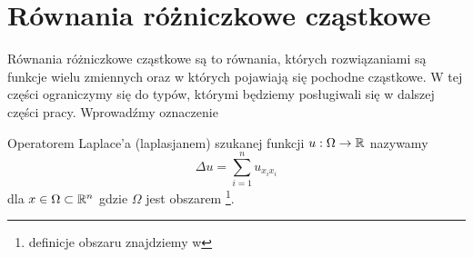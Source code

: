 \documentclass[12pt,a4paper]{report}
\begin{document}
\section{Równania różniczkowe cząstkowe}
Równania różniczkowe cząstkowe są to równania, których rozwiązaniami są funkcje wielu zmiennych oraz w których pojawiają się pochodne cząstkowe. W tej części ograniczymy się do typów, którymi będziemy  posługiwali się  w dalszej części pracy. Wprowadźmy oznaczenie 
\begin{definition}
Operatorem Laplace'a (laplasjanem) szukanej funkcji $u: \Omega \to \mathbb{R}$ nazywamy 
$$
\Delta u  = \sum_{i=1}^{n} u_{x_{i} x_{i}}  
$$
dla $ x \in \Omega \subset \mathbb{R}^{n} $ gdzie $\Omega$ jest obszarem \footnote{definicje obszaru znajdziemy w}. 
\end{definition}
\end{document}
